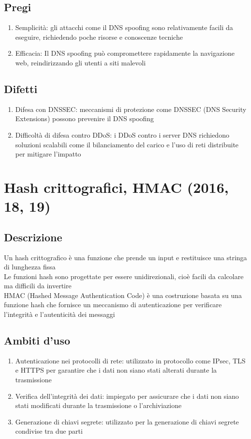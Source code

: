 \documentclass[10pt,oneside,a4paper]{article}
\begin{document}
\begin{enumerate}
\subsection{Pregi}
\begin{enumerate}
\item Semplicità: gli attacchi come il DNS spoofing sono relativamente facili da eseguire, richiedendo poche risorse e conoscenze tecniche
\item Efficacia: Il DNS spoofing può compromettere rapidamente la navigazione web, reindirizzando gli utenti a siti malevoli
\end{enumerate}
\subsection{Difetti}
\begin{enumerate}
\item Difesa con DNSSEC: meccanismi di protezione come DNSSEC (DNS Security Extensions) possono prevenire il DNS spoofing
\item Difficoltà di difesa contro DDoS: i DDoS contro i server DNS richiedono soluzioni scalabili come il bilanciamento del carico e l'uso di reti distribuite per mitigare l'impatto
\end{enumerate}
\section{Hash crittografici, HMAC (2016, 18, 19)}
\subsection{Descrizione}
Un hash crittografico è una funzione che prende un input e restituisce una stringa di lunghezza fissa\\
Le funzioni hash sono progettate per essere unidirezionali, cioè facili da calcolare ma difficili da invertire\\
HMAC (Hashed Message Authentication Code) è una costruzione basata su una funzione hash che fornisce un meccanismo di autenticazione per verificare l'integrità e l'autenticità dei messaggi
\subsection{Ambiti d'uso}
\begin{enumerate}
\item Autenticazione nei protocolli di rete: utilizzato in protocollo come IPsec, TLS e HTTPS per garantire che i dati non siano stati alterati durante la trasmissione
\item Verifica dell'integrità dei dati: impiegato per assicurare che i dati non siano stati modificati durante la trasmissione o l'archiviazione
\item Generazione di chiavi segrete: utilizzato per la generazione di chiavi segrete condivise tra due parti
\end{enumerate}

\end{enumerate}
\end{document}
